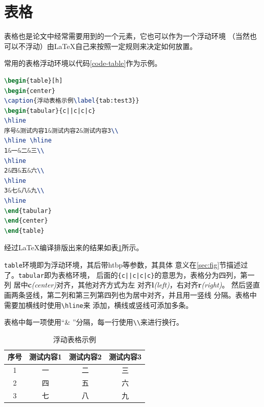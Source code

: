 \section{表格}
表格也是论文中经常需要用到的一个元素，它也可以作为一个浮动环境
（当然也可以不浮动）由\LaTeX{}自己来按照一定规则来决定如何放置。

常用的表格浮动环境以代码\ref{code-table}作为示例。

\begin{lstlisting}[caption={表格浮动环境},label={code-table},language={LaTeX}]
\begin{table}[h]
\begin{center}
\caption{浮动表格示例\label{tab:test3}}
\begin{tabular}{c||c|c|c}
\hline
序号&测试内容1&测试内容2&测试内容3\\
\hline \hline
1&一&二&三\\
\hline
2&四&五&六\\
\hline
3&七&八&九\\
\hline
\end{tabular}
\end{center}
\end{table}
\end{lstlisting}

经过\LaTeX{}编译排版出来的结果如表\ref{tab-test3}所示。

\texttt{table}环境即为浮动环境，其后带htbp等参数，其具体
意义在\ref{sec:fig}节描述过了。\texttt{tabular}即为表格环境，
后面的\texttt{\{c||c|c|c\}}的意思为，表格分为四列，第一列
居中{\bf c}\textit{(center)}对齐，其他对齐方式为左
对齐{\bf l}\textit{(left)}，右对齐{\bf r}\textit{(right)}。
然后竖直画两条竖线，第二列和第三列第四列也为居中对齐，并且用一竖线
分隔。表格中需要加横线时使用\texttt{\textbackslash hline}来
添加，横线或竖线可添加多条。

表格中每一项使用“\& ”分隔，每一行使用\texttt{\textbackslash\textbackslash}来进行换行。
\begin{table}
\begin{center}
\caption{浮动表格示例\label{tab-test3}}
\begin{tabular}{c||c|c|c}
\hline
序号&测试内容1&测试内容2&测试内容3\\
\hline \hline
1&一&二&三\\
\hline
2&四&五&六\\
\hline
3&七&八&九\\
\hline
\end{tabular}
\end{center}
\end{table}

